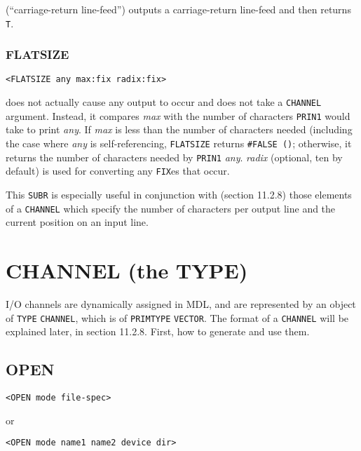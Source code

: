 \documentclass[a4paper]{scrbook}
\begin{document}
 (``carriage-return line-feed'') outputs a carriage-return line-feed and then returns
\texttt{T}.

\subsubsection{FLATSIZE}\label{flatsize}

\begin{verbatim}
<FLATSIZE any max:fix radix:fix>
\end{verbatim}

 does not actually cause any output to occur and does not take a \texttt{CHANNEL} argument.
Instead, it compares \emph{max} with the number of characters \texttt{PRIN1} would take to print \emph{any}. If \emph{max}
is less than the number of characters needed (including the case where \emph{any} is self-referencing, \texttt{FLATSIZE}
returns \texttt{\#FALSE\ ()}; otherwise, it returns the number of characters needed by \texttt{PRIN1} \emph{any}.
\emph{radix} (optional, ten by default) is used for converting any \texttt{FIX}es that occur.

This \texttt{SUBR} is especially useful in conjunction with (section 11.2.8) those elements of a \texttt{CHANNEL} which
specify the number of characters per output line and the current position on an input line.

\section{CHANNEL (the TYPE)}\label{channel-the-type}

I/O channels are dynamically assigned in MDL, and are represented by an object of \texttt{TYPE}
\texttt{CHANNEL}, which is of \texttt{PRIMTYPE} \texttt{VECTOR}. The format of a
\texttt{CHANNEL} will be explained later, in section 11.2.8. First, how to generate and use them.

\subsection{OPEN}\label{open}

\begin{verbatim}
<OPEN mode file-spec>
\end{verbatim}

or

\begin{verbatim}
<OPEN mode name1 name2 device dir>
\end{verbatim}
\end{document}
